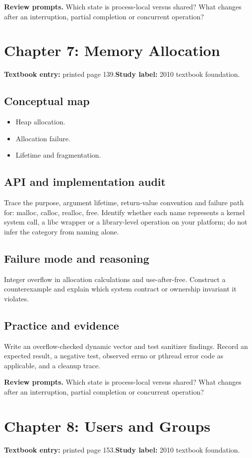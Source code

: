 \documentclass[11pt,letterpaper,oneside]{report}
\begin{document}
\textbf{Review prompts.} Which state is process-local versus shared? What changes after an interruption, partial completion or concurrent operation?

\section{Chapter 7: Memory Allocation}
\textbf{Textbook entry:} printed page 139.\quad \textbf{Study label:} 2010 textbook foundation.

\subsection{Conceptual map}
\begin{itemize}
\item Heap allocation.
\item Allocation failure.
\item Lifetime and fragmentation.
\end{itemize}
\subsection{API and implementation audit}
Trace the purpose, argument lifetime, return-value convention and failure path for: malloc, calloc, realloc, free. Identify whether each name represents a kernel system call, a libc wrapper or a library-level operation on your platform; do not infer the category from naming alone.

\subsection{Failure mode and reasoning}
Integer overflow in allocation calculations and use-after-free. Construct a counterexample and explain which system contract or ownership invariant it violates.

\subsection{Practice and evidence}
Write an overflow-checked dynamic vector and test sanitizer findings. Record an expected result, a negative test, observed errno or pthread error code as applicable, and a cleanup trace.

\textbf{Review prompts.} Which state is process-local versus shared? What changes after an interruption, partial completion or concurrent operation?

\section{Chapter 8: Users and Groups}
\textbf{Textbook entry:} printed page 153.\quad \textbf{Study label:} 2010 textbook foundation.
\end{document}
